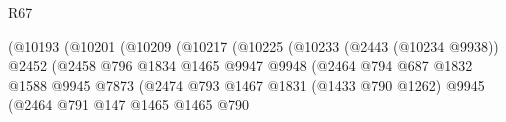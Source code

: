 \begin{lexlean}{R67}
\begin{coremodule}
                                                          (@10193
                                                            (@10201
                                                              (@10209
                                                                (@10217
                                                                  (@10225
                                                                    (@10233
                                                                      (@2443 (@10234 @9938))
                                                                      @2452
                                                                      (@2458
                                                                        @796
                                                                        @1834
                                                                        @1465
                                                                        @9947
                                                                        @9948
                                                                        (@2464
                                                                          @794
                                                                          @687
                                                                          @1832
                                                                          @1588
                                                                          @9945
                                                                          @7873
                                                                          (@2474
                                                                            @793
                                                                            @1467
                                                                            @1831
                                                                            (@1433 @790 @1262)
                                                                            @9945
                                                                            (@2464
                                                                              @791
                                                                              @147
                                                                              @1465
                                                                              @1465
                                                                              @790

\end{coremodule}
\end{lexlean}
